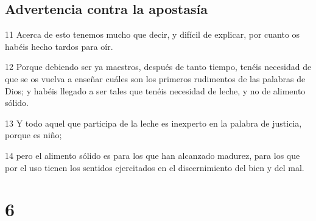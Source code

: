 \section*{Advertencia contra la apostasía}

\par 11 Acerca de esto tenemos mucho que decir, y difícil de explicar, por cuanto os habéis hecho tardos para oír.
\par 12 Porque debiendo ser ya maestros, después de tanto tiempo, tenéis necesidad de que se os vuelva a enseñar cuáles son los primeros rudimentos de las palabras de Dios; y habéis llegado a ser tales que tenéis necesidad de leche, y no de alimento sólido.
\par 13 Y todo aquel que participa de la leche es inexperto en la palabra de justicia, porque es niño;
\par 14 pero el alimento sólido es para los que han alcanzado madurez, para los que por el uso tienen los sentidos ejercitados en el discernimiento del bien y del mal.

\chapter{6}

